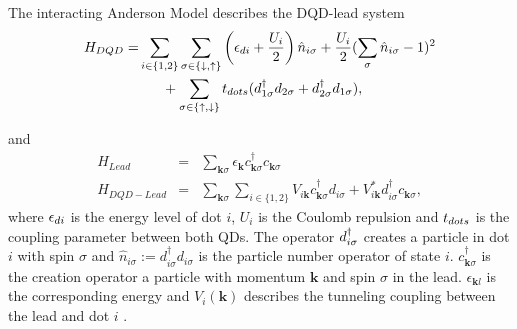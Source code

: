 \documentclass[showpacs,aps,prb,reprint,superscriptaddress]{revtex4-1}
\begin{document}
%





The interacting Anderson Model describes the DQD-lead system  
\begin{align}
\begin{split}
    H_{DQD}=&  \sum_{i\in\{1,2\}} \sum_{\sigma\in \{ \downarrow , \uparrow\}}  \left(\epsilon_{di}+\frac{U_i}{2}\right)\hat{n}_{i\sigma}+ \frac{U_i}{2}(\sum_{\sigma} \hat{n}_{i\sigma}-1)^{2} \\ 
&\ \ \ \ \ + \sum_{\sigma \in \{\uparrow , \downarrow\}} t_{dots}(d^{\dagger}_{1\sigma}  d_{2\sigma}+d^{\dagger}_{2\sigma}  d_{1\sigma}), \label{eq:H_DQD}
\end{split}
\end{align}

and 
\begin{eqnarray}
H_{Lead} & = & \sum_{\mathbf{k}\sigma }\epsilon_{\mathbf{k}}c_{\mathbf{k}\sigma }^{\dagger}c_{\mathbf{k}\sigma } \label{eq:H_L}\\ 
H_{DQD-Lead} & = &  \sum_{\mathbf{k}\sigma }\sum_{i\in\{1,2\}}V_{i\textbf{k}} c_{\mathbf{k}\sigma }^{\dagger}d_{i\sigma}+V^*_{i\textbf{k}} d_{i\sigma}^{\dagger}c_{\mathbf{k}\sigma }  \label{eq:H_DQDL},
\end{eqnarray}
%
where $\epsilon_{di}$ is the energy level of dot $i$, $U_i$ is the Coulomb repulsion and $t_{dots}$ is the coupling parameter between both QDs. The operator $d^{\dagger}_{i\sigma}$ creates a particle in dot $i$ with spin $\sigma$ and $\hat{n}_{i\sigma}:=d_{i\sigma}^{\dagger}d_{i\sigma}$ is the particle number operator of state $i$.  $c_{\mathbf{k}\sigma }^{\dagger}$ is the creation operator a particle with momentum $\mathbf{k}$ and spin
$\sigma$ in the lead.  $\epsilon_{\mathbf{k}l}$ is the corresponding energy
 and $V_i(\textbf{k})$ describes the tunneling coupling between the lead and dot $i$ . \\

\end{document}
